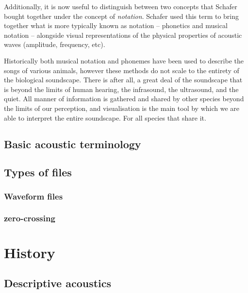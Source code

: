 \documentclass[
]{book}
\begin{document}
Additionally, it is now useful to distinguish between two concepts that Schafer bought together under the concept of \emph{notation}. Schafer used this term to bring together what is more typically known as notation -- phonetics and musical notation -- alongside visual representations of the physical properties of acoustic waves (amplitude, frequency, etc).

Historically both musical notation and phonemes have been used to describe the songs of various animals, however these methods do not scale to the entirety of the biological soundscape. There is after all, a great deal of the soundscape that is beyond the limits of human hearing, the infrasound, the ultrasound, and the quiet. All manner of information is gathered and shared by other species beyond the limits of our perception, and visualisation is the main tool by which we are able to interpret the entire soundscape. For all species that share it.

\hypertarget{basic-acoustic-terminology}{%
\section{Basic acoustic terminology}\label{basic-acoustic-terminology}}

\hypertarget{types-of-files}{%
\section{Types of files}\label{types-of-files}}

\hypertarget{waveform-files}{%
\subsection{Waveform files}\label{waveform-files}}

\hypertarget{zero-crossing-files}{%
\subsection{zero-crossing}\label{zero-crossing-files}}

\hypertarget{history}{%
\chapter{History}\label{history}}

\hypertarget{descriptive-acoustics}{%
\section{Descriptive acoustics}\label{descriptive-acoustics}}
\end{document}
